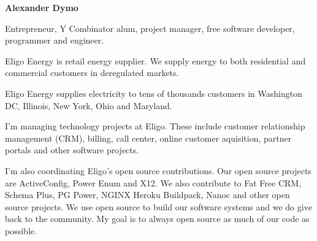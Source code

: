 \documentclass[12pt]{letter}
\begin{document}
{\large\centering\textbf{Alexander Dymo}\\}

\address
{
  \texttt{alex@alexdymo.com} \\
  \url{http://www.alexdymo.com}\\
  \url{http://www.linkedin.com/in/adymo}\\
  +1\,312\,709\,3026 \\
  Chicago, USA \\
}


\begin{llist}

  \vspace{.30in}                %


             Entrepreneur, Y Combinator alum, project manager, free software developer,
             programmer and engineer.



  \startexperience

           \item Eligo Energy is retail energy supplier. We supply energy to both residential and commercial customers in deregulated markets.

           \item Eligo Energy supplies electricity to tens of thousands customers in Washington DC, Illinois, New York, Ohio and Maryland.

           \item I'm managing technology projects at Eligo. These include customer relationship management (CRM), billing, call center, online customer aquisition, partner portals and other software projects.

           \item I'm also coordinating Eligo's open source contributions. Our open source projects are ActiveConfig, Power Enum and X12. We also contribute to Fat Free CRM, Schema Plus, PG Power, NGINX Heroku Buildpack, Nanoc and other open source projects. We use open source to build our software systems and we do give back to the community. My goal is to always open source as much of our code as possible.


\end{llist}
\end{document}
